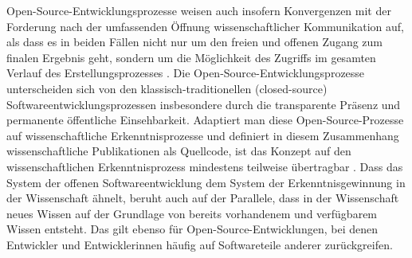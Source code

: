 Open-Source-Entwicklungsprozesse weisen auch insofern Konvergenzen mit der Forderung nach der umfassenden Öffnung wissenschaftlicher Kommunikation auf, als dass es in beiden Fällen nicht nur um den freien und offenen Zugang zum finalen Ergebnis geht, sondern um die Möglichkeit des Zugriffs im gesamten Verlauf des Erstellungsprozesses \cite{kelty_2004}. Die Open-Source-Entwicklungsprozesse unterscheiden sich von den klassisch-traditionellen (closed-source) Softwareentwicklungsprozessen insbesondere durch die transparente Präsenz und permanente öffentliche Einsehbarkeit. Adaptiert man diese Open-Source-Prozesse auf wissenschaftliche Erkenntnisprozesse und definiert in diesem Zusammenhang wissenschaftliche Publikationen als Quellcode, ist das Konzept auf den wissenschaftlichen Erkenntnisprozess mindestens teilweise übertragbar \cite{garcia_2010_open} \cite{Singh_2008} \cite{Bradley_2008} \cite{mantz_2007_open} \cite{dorschel_2006_open} \cite{Bradley_2007} \cite{Willinsky_2005}. Dass das System der offenen Softwareentwicklung dem System der Erkenntnisgewinnung in der Wissenschaft ähnelt, beruht auch auf der Parallele, dass in der Wissenschaft neues Wissen auf der Grundlage von bereits vorhandenem und verfügbarem Wissen entsteht. Das gilt ebenso für Open-Source-Entwicklungen, bei denen Entwickler und Entwicklerinnen häufig auf Softwareteile anderer zurückgreifen.

